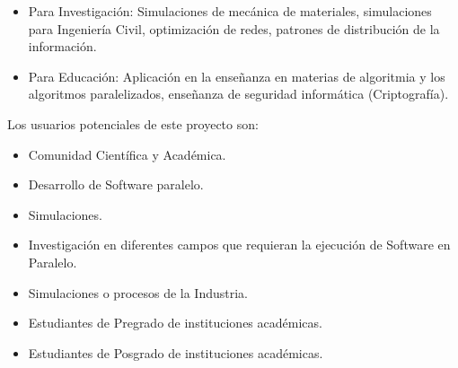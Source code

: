 \begin{itemize}
\begin{itemize}


		\item Para Investigación: Simulaciones de mecánica de materiales, simulaciones para Ingeniería Civil, optimización de redes, patrones de distribución de la información.


		\item Para Educación: Aplicación en la enseñanza en materias de algoritmia y los algoritmos paralelizados, 		enseñanza de seguridad informática (Criptografía).



	\end{itemize}

	Los usuarios potenciales de este proyecto son: 

		\begin{itemize}
			\item Comunidad Científica y Académica.
			\item Desarrollo de Software paralelo. 
			\item Simulaciones.
			\item Investigación en diferentes campos que requieran la ejecución de Software en Paralelo. 
			\item Simulaciones o procesos de la Industria.
			\item Estudiantes de Pregrado de instituciones académicas.
			\item Estudiantes de Posgrado de instituciones académicas.
		\end{itemize}

\end{itemize}



